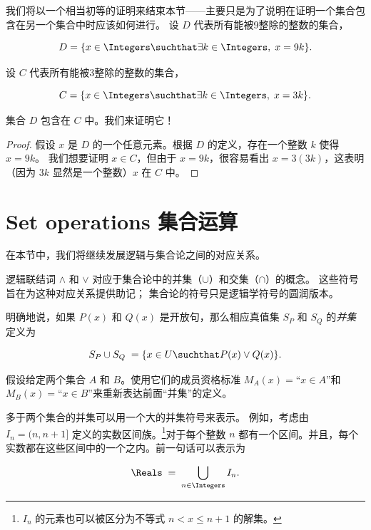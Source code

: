 我们将以一个相当初等的证明来结束本节——主要只是为了说明在证明一个集合包含在另一个集合中时应该如何进行。
设 $D$ 代表所有能被9整除的整数的集合，

\[ D = \{ x \in \Integers \suchthat \exists k \in \Integers, \; x=9k \}. \]

设 $C$ 代表所有能被3整除的整数的集合，

\[ C = \{ x \in \Integers \suchthat \exists k \in \Integers, \; x=3k \}. \]

集合 $D$ 包含在 $C$ 中。我们来证明它！
\begin{proof}
假设 $x$ 是 $D$ 的一个任意元素。根据 $D$ 的定义，存在一个整数 $k$ 使得 $x=9k$。
我们想要证明 $x \in C$，但由于 $x=9k$，很容易看出 $x = 3(3k)$，这表明（因为 $3k$ 显然是一个整数）$x$ 在 $C$ 中。
\end{proof}

\clearpage 




\newpage

\section{Set operations 集合运算}
\label{sec:set_ops}

在本节中，我们将继续发展逻辑与集合论之间的对应关系。

逻辑联结词 $\land$ 和 $\lor$ 对应于集合论中的并集（$\cup$）和交集（$\cap$）的概念。
这些符号旨在为这种对应关系提供助记；
集合论的符号只是逻辑学符号的圆润版本。

明确地说，如果 $P(x)$ 和 $Q(x)$ 是开放句，那么相应真值集 $S_P$ 和 $S_Q$ 的\emph{并集}定义为

\[ S_P \cup S_Q \; = \{ x \in U \suchthat P(x) \lor Q(x) \}. \]

\begin{exer}
假设给定两个集合 $A$ 和 $B$。使用它们的成员资格标准 $M_A(x) = $“$x \in A$”和 $M_B(x) = $“$x \in B$”来重新表达前面“并集”的定义。
\end{exer}

多于两个集合的并集可以用一个大的并集符号来表示。
例如，考虑由 $I_n = (n,n+1]$ 定义的实数区间族。\footnote{$I_n$ 的元素也可以被区分为不等式 $n < x \leq n+1$ 的解集。}对于每个整数 $n$ 都有一个区间。并且，每个实数都在这些区间中的一个之内。前一句话可以表示为

\[ \Reals \; = \; \bigcup_{n\in\Integers} I_n. \]

